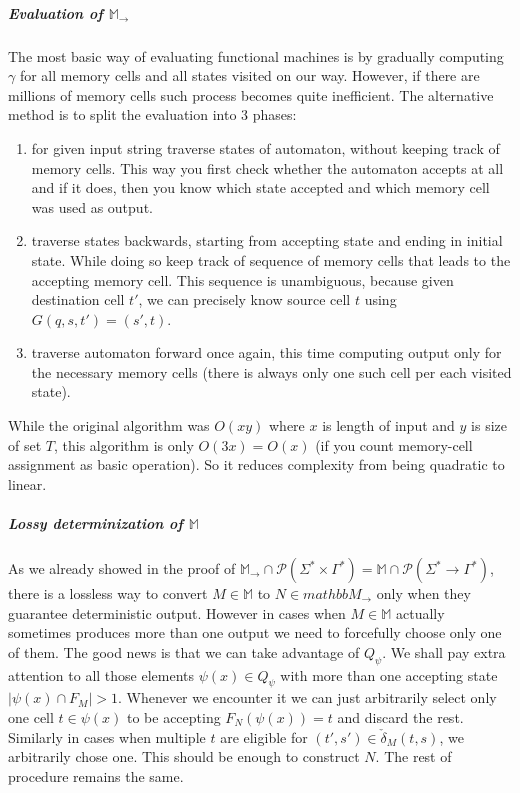 \documentclass[12pt]{article}
\begin{document}
\subparagraph{Evaluation of $\mathbb{M}_\rightarrow$} The most basic way of evaluating functional machines is by gradually computing $\gamma$ for all memory cells and all states visited on our way. However, if there are millions of memory cells such process becomes quite inefficient. The alternative method is to split the evaluation into 3 phases:
\begin{enumerate}
	\item for given input string traverse states of automaton, without keeping track of memory cells. This way you first check whether the automaton accepts at all and if it does, then you know which state accepted and which memory cell was used as output.
	\item traverse states backwards, starting from accepting state and ending in initial state. While doing so keep track of sequence of memory cells that leads to the accepting memory cell. This sequence is unambiguous, because given destination cell $t'$, we can precisely know source cell $t$ using $G(q,s,t') = (s',t)$.
	\item traverse automaton forward once again, this time computing output only for the necessary memory cells (there is always only one such cell per each visited state). 
\end{enumerate}
While the original algorithm was $O(xy)$ where $x$ is length of input and $y$ is size of set $T$, this algorithm is only $O(3x) = O(x)$ (if you count memory-cell assignment as basic operation). So it reduces complexity from being quadratic to linear.

\subparagraph{Lossy determinization of $\mathbb{M}$} As we already showed in the proof of $\mathbb{M}_\rightarrow \cap \mathcal{P}(\Sigma^* \times \Gamma^*) =  \mathbb{M} \cap \mathcal{P}(\Sigma^* \rightarrow \Gamma^*)$, there is a lossless way to convert $M \in \mathbb{ M}$ to $N \in mathbb{M}_\rightarrow$ only when they guarantee deterministic output. However in cases when $M \in \mathbb{ M}$ actually sometimes produces more than one output we need to forcefully choose only one of them. The good news is that we can take advantage of $Q_\psi$. We shall pay extra attention to all those elements $\psi(x) \in Q_\psi$ with more than one accepting state $\vert\psi(x) \cap F_M\vert > 1$. Whenever we encounter it we can just arbitrarily select only one cell $t \in \psi(x)$ to be accepting $F_N(\psi(x)) = t$ and discard the rest. Similarly in cases when multiple $t$ are eligible for $(t',s') \in \check{\delta}_M(t,s)$, we arbitrarily chose one. This should be enough to construct $N$. The rest of procedure remains the same. 
\end{document}
